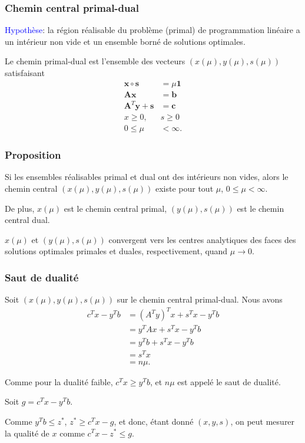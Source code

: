 \documentclass[usepdftitle=false, aspectratio=169]{beamer}
\def\bb{\boldsymbol{b}}
\def\bc{\boldsymbol{c}}
\def\bs{\boldsymbol{s}}
\def\bx{\boldsymbol{x}}
\def\by{\boldsymbol{y}}
\def\bA{\boldsymbol{A}}
\def\bone{\boldsymbol{1}}
\begin{document}
\begin{frame}
\frametitle{Chemin central primal-dual}

\textcolor{blue}{Hypothèse}: la région réalisable du problème (primal) de programmation linéaire a un intérieur non vide et un ensemble borné de solutions optimales.


\mbox{}

Le chemin primal-dual est l'ensemble des vecteurs $(x(\mu), y(\mu), s(\mu))$ satisfaisant
\begin{align*}
\bx \circ \bs &= \mu \bone \\
\bA\bx &= \bb \\
\bA^T\by + \bs & = \bc \\
x \geq 0,\ & s \geq 0 \\
0 \leq \mu & < \infty.
\end{align*}

\end{frame}

\begin{frame}
\frametitle{Proposition}

Si les ensembles réalisables primal et dual ont des intérieurs non vides, alors le chemin central $(x(\mu), y(\mu), s(\mu))$ existe pour tout $\mu$, $0 \leq \mu < \infty$.

\mbox{}

De plus, $x(\mu)$ est le chemin central primal, $(y(\mu), s(\mu))$ est le chemin central dual.

\mbox{}

$x(\mu)$ et $(y(\mu), s(\mu))$ convergent vers les centres analytiques des faces des solutions optimales primales et duales, respectivement, quand $\mu \rightarrow 0$.

\end{frame}

\begin{frame}
\frametitle{Saut de dualité}

Soit $(x(\mu), y(\mu), s(\mu))$ sur le chemin central primal-dual.
Nous avons
\begin{align*}
c^Tx - y^Tb &= (A^T y)^T x + s^Tx - y^T b \\
& = y^T Ax + s^Tx - y^T b \\
& = y^T b + s^Tx - y^T b \\
& = s^Tx \\
& = n\mu.
\end{align*}

\mbox{}

Comme pour la dualité faible, $c^T x \geq y^T b$, et $n\mu$ est appelé le saut de dualité.

\mbox{}

Soit $g = c^Tx - y^Tb$.

\mbox{}

Comme $y^T b \leq z^*$, $z^* \geq c^Tx - g$, et donc, étant donné $(x, y, s)$, on peut mesurer la qualité de $x$ comme $c^T x - z^* \leq g$.
\end{frame}
\end{document}

